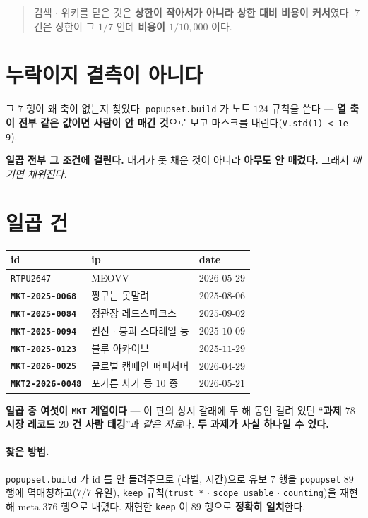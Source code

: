 \documentclass[11pt]{article}
\begin{document}
\begin{quote}
검색 $\cdot$ 위키를 닫은 것은 \textbf{상한이 작아서가 아니라 상한 대비
비용이 커서}였다. $7$ 건은 상한이 그 $1/7$ 인데 \textbf{비용이
$1/10{,}000$} 이다.
\end{quote}

\section{누락이지 결측이 아니다}

그 $7$ 행이 왜 축이 없는지 찾았다. \texttt{popupset.build} 가 노트 $124$
규칙을 쓴다 --- \textbf{열 축이 전부 같은 값이면 사람이 안 매긴 것}으로
보고 마스크를 내린다(\texttt{V.std(1) < 1e-9}).

\textbf{일곱 전부 그 조건에 걸린다.} 태거가 못 채운 것이 아니라
\textbf{아무도 안 매겼다.} 그래서 \emph{매기면 채워진다.}

\section{일곱 건}

\begin{center}
\begin{tabular}{lll}
\hline
id & ip & date \\
\hline
\texttt{RTPU2647} & MEOVV & $2026$-$05$-$29$ \\
\textbf{\texttt{MKT-2025-0068}} & 짱구는 못말려 & $2025$-$08$-$06$ \\
\textbf{\texttt{MKT-2025-0084}} & 정관장 레드스파크스 & $2025$-$09$-$02$ \\
\textbf{\texttt{MKT-2025-0094}} & 원신 $\cdot$ 붕괴 스타레일 등 & $2025$-$10$-$09$ \\
\textbf{\texttt{MKT-2025-0123}} & 블루 아카이브 & $2025$-$11$-$29$ \\
\textbf{\texttt{MKT-2026-0025}} & 글로벌 캠페인 퍼피서머 & $2026$-$04$-$29$ \\
\textbf{\texttt{MKT2-2026-0048}} & 포가튼 사가 등 $10$ 종 & $2026$-$05$-$21$ \\
\hline
\end{tabular}
\end{center}

\textbf{일곱 중 여섯이 \texttt{MKT} 계열이다} --- 이 판의 상시 갈래에
두 해 동안 걸려 있던 ``\textbf{과제 $78$ 시장 레코드 $20$ 건 사람 태깅}''과
\emph{같은 자료}다. \textbf{두 과제가 사실 하나일 수 있다.}

\paragraph{찾은 방법.}
\texttt{popupset.build} 가 id 를 안 돌려주므로 (라벨, 시간)으로 유보 $7$
행을 \texttt{popupset} $89$ 행에 역매칭하고($7/7$ 유일), \texttt{keep}
규칙(\texttt{trust\_*} $\cdot$ \texttt{scope\_usable} $\cdot$
\texttt{counting})을 재현해 meta $376$ 행으로 내렸다. 재현한
\texttt{keep} 이 $89$ 행으로 \textbf{정확히 일치}한다.
\end{document}
